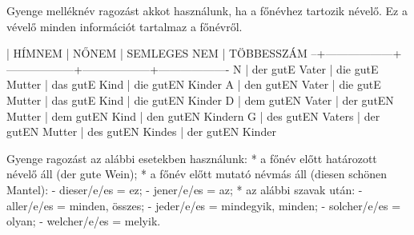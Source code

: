 \documentclass{article}
\newenvironment{desc}{\verbatim}{\endverbatim}
\begin{document}
\begin{desc}
Gyenge melléknév ragozást akkot használunk, ha a főnévhez tartozik névelő. Ez a vévelő minden információt tartalmaz a főnévről.

  | HÍMNEM           | NŐNEM            | SEMLEGES NEM     | TÖBBESSZÁM
--+------------------+------------------+------------------+-------------------
N | der gutE Vater   | die gutE Mutter  | das gutE Kind    | die gutEN Kinder
A | den gutEN Vater  | die gutE Mutter  | das gutE Kind    | die gutEN Kinder
D | dem gutEN Vater  | der gutEN Mutter | dem gutEN Kind   | den gutEN Kindern
G | des gutEN Vaters | der gutEN Mutter | des gutEN Kindes | der gutEN Kinder

Gyenge ragozást az alábbi esetekben használunk:
* a főnév előtt határozott névelő áll (der gute Wein);
* a főnév előtt mutató névmás áll (diesen schönen Mantel):
  - dieser/e/es = ez;
  - jener/e/es = az;
* az alábbi szavak után:
  - aller/e/es = minden, összes;
  - jeder/e/es = mindegyik, minden;
  - solcher/e/es = olyan;
  - welcher/e/es = melyik.
\end{desc}
\end{document}
